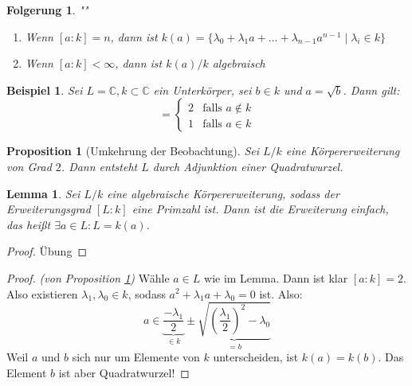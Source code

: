 \documentclass[a4paper,12pt,numbers=noenddot,parskip=full]{scrartcl}
\newcommand{\setC}{\mathbb{C}}
\theoremstyle{dotless}
\newtheorem{corollary}[theorem]{Folgerung}
\newtheorem{proposition}[theorem]{Proposition}
\newtheorem{lemma}[theorem]{Lemma}
\newtheorem{example}[theorem]{Beispiel}
\theoremstyle{remark}
\begin{document}
	\begin{corollary}""
		\begin{enumerate}
			\item Wenn $[a:k] = n$, dann ist $k(a) = \{ \lambda_0 + \lambda_1 a + \dots + \lambda_{n-1} a^{n-1} \mid \lambda_i \in k \}$
			\item Wenn $[a:k] < \infty$, dann ist $k(a)/k$ algebraisch
		\end{enumerate}
	\end{corollary}

	\begin{example}
		Sei $L = \setC, k \subset \setC$ ein Unterkörper, sei $b \in k$ und $a = \sqrt{b}$. Dann gilt:
		\begin{equation*}
			[k(a): k] = \begin{cases}
				2 & \text{falls $a \notin k$} \\
				1 & \text{falls $a \in k$}
			\end{cases}
		\end{equation*}
	\end{example}

	\begin{proposition}[Umkehrung der Beobachtung]
		\label{prop:umkehrungDerBeobachtung}
		Sei $L/k$ eine Körpererweiterung von Grad $2$. Dann entsteht $L$ durch Adjunktion einer Quadratwurzel.
	\end{proposition}

	\begin{lemma}
		Sei $L/k$ eine algebraische Körpererweiterung, sodass der Erweiterungsgrad $[L:k]$ eine Primzahl ist. Dann ist die Erweiterung einfach, das heißt $\exists a \in L: L = k(a)$.
	\end{lemma}

	\begin{proof}
		Übung
	\end{proof}

	\begin{proof}\textit{(von Proposition \ref{prop:umkehrungDerBeobachtung})}
		Wähle $a \in L$ wie im Lemma. Dann ist klar $[a:k] = 2$. Also existieren $\lambda_1, \lambda_0 \in k$, sodass $a^2 + \lambda_1 a + \lambda_0 = 0$ ist. Also:
		\begin{equation*}
			a \in \underbrace{\frac{- \lambda_1}{2}}_{\in k} \pm \underbrace{\sqrt{\left( \frac{\lambda_1}{2} \right)^2 - \lambda_0}}_{=b}
		\end{equation*}
		Weil $a$ und $b$ sich nur um Elemente von $k$ unterscheiden, ist $k(a) = k(b)$. Das Element $b$ ist aber Quadratwurzel!
	\end{proof}
\end{document}
